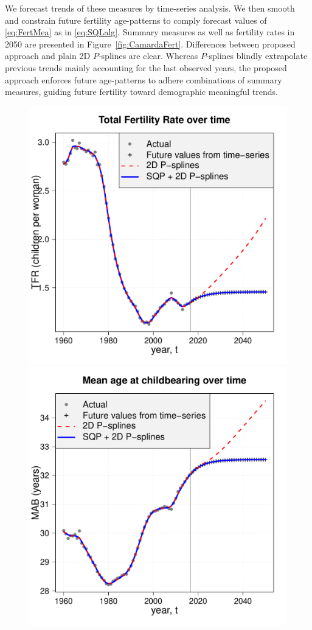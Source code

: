 \documentclass[twoside]{report}
\begin{document}
We forecast trends of these measures by time-series analysis. We then smooth and constrain future fertility age-patterns to comply forecast values of \eqref{eq:FertMea} as in \eqref{eq:SQLalg}. Summary measures as well as fertility rates in 2050 are presented in Figure~\ref{fig:CamardaFert}. Differences between proposed approach and plain 2D $P$-splines are clear. Whereas $P$-splines blindly extrapolate previous trends mainly accounting for the last observed years, the proposed approach enforces future age-patterns to adhere combinations of summary measures, guiding future fertility toward demographic meaningful trends. 

\begin{figure}[!ht]\centering
	\includegraphics[scale=0.277]{Camardafig2a.pdf}
	\includegraphics[scale=0.277]{Camardafig2b.pdf}

\end{figure}
\end{document}
